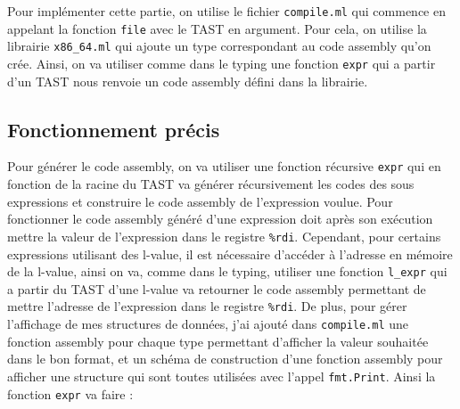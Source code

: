 \documentclass[10pt]{report}
\begin{document}
Pour implémenter cette partie, on utilise le fichier \verb|compile.ml| qui commence en appelant la fonction \verb|file| avec le TAST en argument. Pour cela, on utilise la librairie \verb|x86_64.ml| qui ajoute un type correspondant au code assembly qu'on crée. Ainsi, on va utiliser comme dans le typing une fonction \verb|expr| qui a partir d'un TAST nous renvoie un code assembly défini dans la librairie.

\subsection{Fonctionnement précis}

Pour générer le code assembly, on va utiliser une fonction récursive \verb|expr| qui en fonction de la racine du TAST va générer récursivement les codes des sous expressions et construire le code assembly de l'expression voulue. Pour fonctionner le code assembly généré d'une expression doit après son exécution mettre la valeur de l'expression dans le registre \verb|%rdi|. Cependant, pour certains expressions utilisant des l-value, il est nécessaire d'accéder à l'adresse en mémoire de la l-value, ainsi on va, comme dans le typing, utiliser une fonction \verb|l_expr| qui a partir du TAST d'une l-value va retourner le code assembly permettant de mettre l'adresse de l'expression dans le registre \verb|%rdi|. De plus, pour gérer l'affichage de mes structures de données, j'ai ajouté dans \verb|compile.ml| une fonction assembly pour chaque type permettant d'afficher la valeur souhaitée dans le bon format, et un schéma de construction d'une fonction assembly pour afficher une structure qui sont toutes utilisées avec l'appel \verb|fmt.Print|. Ainsi la fonction \verb|expr| va faire :
\end{document}
